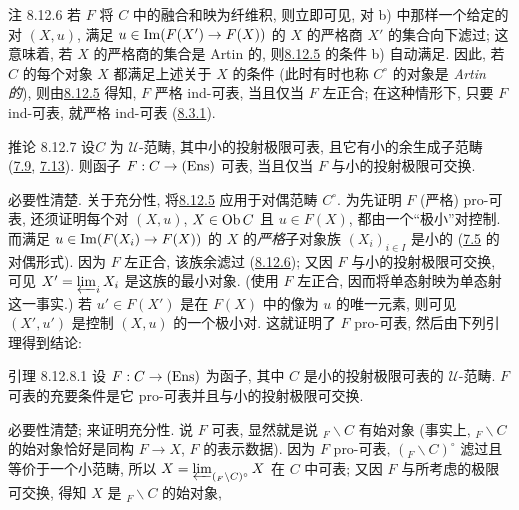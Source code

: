 \begin{enonce*}[remark]{注 8.12.6}
若 $F$ 将 $C$ 中的融合和映为纤维积,
则立即可见, 对 b) 中那样一个给定的对 $(X,u)$,
满足 $u\in\operatorname{Im}(F(X')\rightarrow F(X))$ 的 $X$ 的严格商 $X'$ 的集合向下滤过;
这意味着, 若 $X$ 的严格商的集合是 Artin 的,
则\hyperref[I.prop8.12.5]{8.12.5} 的条件 b) 自动满足.
因此, 若 $C$ 的每个对象 $X$ 都满足上述关于 $X$ 的条件
(此时有时也称 $C^\circ$ 的对象是 \emph{Artin 的}),
则由\hyperref[I.prop8.12.5]{8.12.5} 得知,
$F$ 严格 ind-可表, 当且仅当 $F$ 左正合;
在这种情形下, 只要 $F$ ind-可表, 就严格 ind-可表 (\hyperref[I.prop8.3.1]{8.3.1}).
\end{enonce*}




\begin{enonce*}{推论 8.12.7}
设\pageoriginale $C$ 为 $𝒰$-范畴, 其中小的投射极限可表,
且它有小的余生成子范畴 (\hyperref[I.sec7.9]{7.9},
\hyperref[I.exem7.13]{7.13}).
则函子 $F:C\rightarrow (\operatorname{Ens})$ 可表, 当且仅当 $F$ 与小的投射极限可交换.
\end{enonce*}
必要性清楚. 关于充分性, 将\hyperref[I.prop8.12.5]{8.12.5} 应用于对偶范畴 $C^\circ$.
为先证明 $F$ (严格) pro-可表, 还须证明每个对 $(X,u)$,
$X\in \operatorname{Ob} C$ 且 $u\in F(X)$, 都由一个“极小”对控制.
而满足 $u\in\operatorname{Im}(F(X_i)\rightarrow F(X))$ 的 $X$ 的\emph{严格}子对象族
$(X_i)_{i\in I}$ 是小的 (\hyperref[I.cor7.5]{7.5} 的对偶形式).
因为 $F$ 左正合, 该族余滤过 (\hyperref[I.rem8.12.6]{8.12.6});
又因 $F$ 与小的投射极限可交换, 可见 $X'=\varprojlim_i X_i$ 是这族的最小对象.
(使用 $F$ 左正合, 因而将单态射映为单态射这一事实.)
若 $u'\in F(X')$ 是在 $F(X)$ 中的像为 $u$ 的唯一元素,
则可见 $(X',u')$ 是控制 $(X,u)$ 的一个极小对.
这就证明了 $F$ pro-可表, 然后由下列引理得到结论:

\begin{enonce*}{引理 8.12.8.1}
设 $F:C\rightarrow(\operatorname{Ens})$ 为函子,
其中 $C$ 是小的投射极限可表的 $𝒰$-范畴.
$F$ 可表的充要条件是它 pro-可表并且与小的投射极限可交换.
\end{enonce*}

必要性\pageoriginale 清楚; 来证明充分性.
说 $F$ 可表, 显然就是说 ${}_F\backslash C$ 有始对象
(事实上, ${}_F\backslash C$ 的始对象恰好是同构 $F\rightarrow X$,
\ie $F$ 的表示数据).
因为 $F$ pro-可表, $({}_F\backslash C)^\circ$ 滤过且等价于一个小范畴,
所以 $X=\varprojlim_{({}_F\backslash C)^\circ} X$ 在 $C$ 中可表;
又因 $F$ 与所考虑的极限可交换, 得知 $X$ 是 ${}_F\backslash C$ 的始对象, \cqfd

